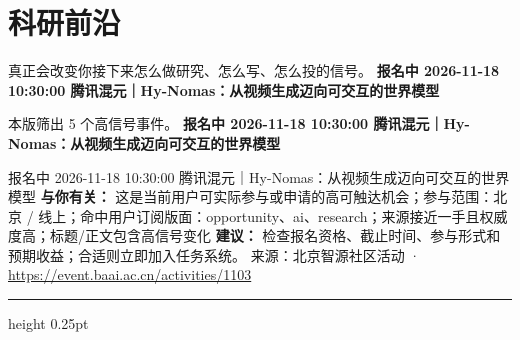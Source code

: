\documentclass[10.5pt]{ctexart}
\begin{document}
\section*{科研前沿}
{\color{ormuted} 真正会改变你接下来怎么做研究、怎么写、怎么投的信号。}
\vspace{2mm}
{\LARGE\bfseries 报名中 2026-11-18 10:30:00 腾讯混元｜Hy-Nomas：从视频生成迈向可交互的世界模型}\par
\vspace{1mm}
{\color{ormuted} 本版筛出 5 个高信号事件。}
\vspace{3mm}
{\Large\bfseries 报名中 2026-11-18 10:30:00 腾讯混元｜Hy-Nomas：从视频生成迈向可交互的世界模型}\par
报名中 2026-11-18 10:30:00 腾讯混元｜Hy-Nomas：从视频生成迈向可交互的世界模型
\textbf{与你有关：} 这是当前用户可实际参与或申请的高可触达机会；参与范围：北京 / 线上；命中用户订阅版面：opportunity、ai、research；来源接近一手且权威度高；标题/正文包含高信号变化
\textbf{建议：} 检查报名资格、截止时间、参与形式和预期收益；合适则立即加入任务系统。
{\footnotesize\color{ormuted} 来源：北京智源社区活动 · \url{https://event.baai.ac.cn/activities/1103}}
\vspace{4mm}
\hrule height 0.25pt
\vspace{3mm}
\end{document}
